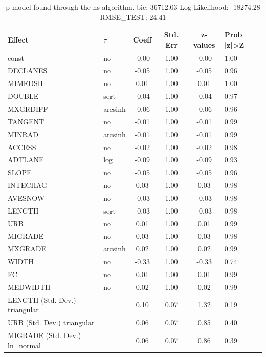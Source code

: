 \begin{table}
	\caption{p model found through the hs algorithm. bic: 36712.03 Log-Likelihood: -18274.28 RMSE_TEST: 24.41}
	\begin{center}
		\begin{tabular}{|l|l|c|c|c|l|}
			\hline
			Effect & $\tau$ & Coeff & Std. Err & z-values & Prob |z|>Z \\
			\hline
			const & no & -0.00 & 1.00 & -0.00 & 1.00 \\
			\hline
			DECLANES & no & -0.05 & 1.00 & -0.05 & 0.96 \\
			\hline
			MIMEDSH & no & 0.01 & 1.00 & 0.01 & 1.00 \\
			\hline
			DOUBLE & sqrt & -0.04 & 1.00 & -0.04 & 0.97 \\
			\hline
			MXGRDIFF & arcsinh & -0.06 & 1.00 & -0.06 & 0.96 \\
			\hline
			TANGENT & no & -0.01 & 1.00 & -0.01 & 0.99 \\
			\hline
			MINRAD & arcsinh & -0.01 & 1.00 & -0.01 & 0.99 \\
			\hline
			ACCESS & no & -0.02 & 1.00 & -0.02 & 0.98 \\
			\hline
			ADTLANE & log & -0.09 & 1.00 & -0.09 & 0.93 \\
			\hline
			SLOPE & no & -0.05 & 1.00 & -0.05 & 0.96 \\
			\hline
			INTECHAG & no & 0.03 & 1.00 & 0.03 & 0.98 \\
			\hline
			AVESNOW & no & -0.03 & 1.00 & -0.03 & 0.98 \\
			\hline
			LENGTH & sqrt & -0.03 & 1.00 & -0.03 & 0.98 \\
			\hline
			URB & no & 0.01 & 1.00 & 0.01 & 0.99 \\
			\hline
			MIGRADE & no & 0.03 & 1.00 & 0.03 & 0.98 \\
			\hline
			MXGRADE & arcsinh & 0.02 & 1.00 & 0.02 & 0.99 \\
			\hline
			WIDTH & no & -0.33 & 1.00 & -0.33 & 0.74 \\
			\hline
			FC & no & 0.01 & 1.00 & 0.01 & 0.99 \\
			\hline
			MEDWIDTH & no & 0.02 & 1.00 & 0.02 & 0.99 \\
			\hline
			LENGTH (Std. Dev.) triangular &  & 0.10 & 0.07 & 1.32 & 0.19 \\
			\hline
			URB (Std. Dev.) triangular &  & 0.06 & 0.07 & 0.85 & 0.40 \\
			\hline
			MIGRADE (Std. Dev.) ln_normal &  & 0.06 & 0.07 & 0.86 & 0.39 \\

\end{tabular}
\end{center}
\end{table}

